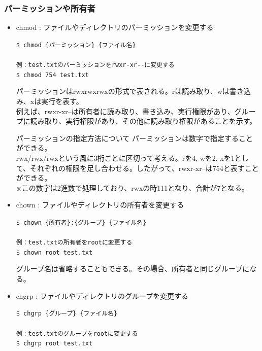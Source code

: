 \documentclass[a4paper, 11pt, dvipdfmx]{jsarticle}
\begin{document}
\subsubsection{パーミッションや所有者}
\begin{itemize}
  \item chmod : ファイルやディレクトリのパーミッションを変更する\\
  \begin{terminalbox}
    \verb|$ chmod {パーミッション} {ファイル名}|\\\\
    \verb|例：test.txtのパーミッションをrwxr-xr--に変更する|\\
    \verb|$ chmod 754 test.txt|
  \end{terminalbox}
  パーミッションはrwxrwxrwxの形式で表される。rは読み取り、wは書き込み、xは実行を表す。\\
  例えば、rwxr-xr--は所有者に読み取り、書き込み、実行権限があり、グループに読み取り、実行権限があり、その他に読み取り権限があることを示す。
  \begin{hosokubox}{パーミッションの指定方法について}
    パーミッションは数字で指定することができる。\\
    rwx/rwx/rwxという風に3桁ごとに区切って考える。rを4, wを2, xを1として、それぞれの権限を足し合わせる。したがって、rwxr-xr--は754と表すことができる。\\
    ※この数字は2進数で処理しており、rwxの時111となり、合計が7となる。
  \end{hosokubox}
  \item chown : ファイルやディレクトリの所有者を変更する
  \begin{terminalbox}
    \verb|$ chown {所有者}:{グループ} {ファイル名}|\\\\
    \verb|例：test.txtの所有者をrootに変更する|\\
    \verb|$ chown root test.txt|
  \end{terminalbox}
  グループ名は省略することもできる。その場合、所有者と同じグループになる。
  \item chgrp : ファイルやディレクトリのグループを変更する
  \begin{terminalbox}
    \verb|$ chgrp {グループ} {ファイル名}|\\\\
    \verb|例：test.txtのグループをrootに変更する|\\
    \verb|$ chgrp root test.txt|
  \end{terminalbox}
\end{itemize}
\end{document}
